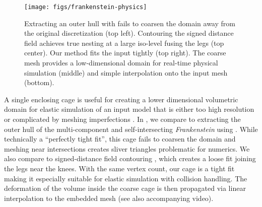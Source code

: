 \begin{figure}
  \texttt{[image: figs/frankenstein-physics]}
  \caption{Extracting an outer hull with \protect\cite{Jacobson:WN:2013} fails
  to coarsen the domain away from the original discretization (top left). Contouring
  the signed distance field \protect\cite{Xu:2014:SDF} achieves true nesting at
  a large iso-level fusing the legs (top center). Our method fits the input
  tightly (top right). The coarse mesh provides a low-dimensional domain for
  real-time physical simulation (middle) and simple interpolation onto the
  input mesh (bottom).}
  \label{fig:frankenstein-physics}
\end{figure}

A single enclosing cage is useful for creating a lower dimensional volumetric
domain for elastic simulation of an input model that is either too high
resolution or complicated by meshing imperfections \cite{Xu:2014:SDF}.
%
In , we compare to extracting the outer hull of
the multi-component and self-intersecting \emph{Frankenstein} using
\cite{Jacobson:WN:2013}.
%
While technically a ``perfectly tight fit'', this cage fails to coarsen the
domain and meshing near intersections creates sliver triangles problematic for
numerics.
%
We also compare to signed-distance field contouring \cite{Xu:2014:SDF}, which
creates a loose fit joining the legs near the knees.
%
With the same vertex count, our cage is a tight fit making it especially
suitable for elastic simulation with collision handling.
%
The deformation of the volume inside the coarse cage is then propagated via
linear interpolation to the embedded mesh (see also accompanying video).

